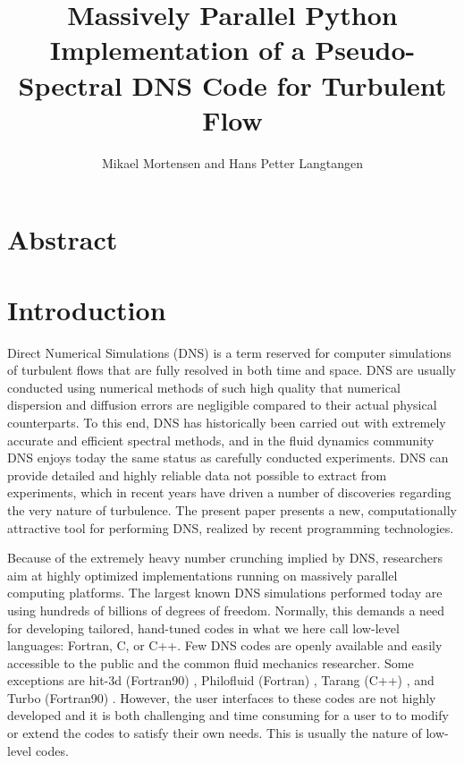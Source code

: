 \documentclass[11pt, oneside]{article}
\title{Massively Parallel Python Implementation of a Pseudo-Spectral DNS Code for Turbulent Flow}
\author{Mikael Mortensen and Hans Petter Langtangen}
\begin{document}
\maketitle
\section{Abstract}

\section{Introduction}
Direct Numerical Simulations (DNS) is a term reserved for computer simulations of turbulent flows that are fully resolved in both time and space. DNS are usually conducted using numerical methods of such high quality that numerical dispersion and diffusion errors are negligible compared to their actual physical counterparts. To this end, DNS has historically been carried out with extremely accurate and efficient spectral methods, and in the fluid dynamics community DNS enjoys  today the same status as carefully conducted experiments. DNS can provide detailed and highly reliable data not possible to extract from experiments, which in recent years have driven a number of discoveries regarding the very nature of turbulence. The present paper presents a new, computationally attractive tool for performing DNS, realized by recent programming technologies.

Because of the extremely heavy number crunching implied by DNS,
researchers aim at highly optimized implementations running on
massively parallel computing platforms. The largest known DNS
simulations performed today are using hundreds of billions of degrees
of freedom. Normally, this demands a need for developing tailored, hand-tuned
codes in what we here call low-level languages: Fortran, C, or C++. Few
DNS codes are openly available and easily accessible to the public and
the common fluid mechanics researcher. Some exceptions are hit-3d
(Fortran90) \cite{hit-3d}, Philofluid (Fortran) \cite{philofluid},
Tarang (C++) \cite{tarang}, and Turbo (Fortran90)
\cite{turbo}. However, the user interfaces to these codes are not highly developed and it is both challenging and time consuming for a user to to modify or extend the codes to satisfy their own needs. This is usually the nature of low-level codes.
\end{document}
